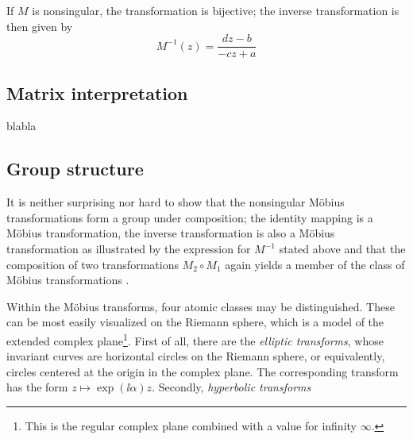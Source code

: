 If \(M\) is nonsingular, the transformation is bijective; the inverse transformation is then given by \cite{Needham1997}
\[ M^{-1}(z) = \frac{dz - b}{-cz + a} \]

    
\subsection{Matrix interpretation}
blabla

\subsection{Group structure}
It is neither surprising nor hard to show that the nonsingular Möbius transformations form a group under composition; the identity mapping is a Möbius transformation, the inverse transformation is also a Möbius transformation as illustrated by the expression for \(M^{-1}\) stated above and that the composition of two transformations \(M_2 \circ M_1\) again yields a member of the class of Möbius transformations \cite{Needham1997}.

Within the Möbius transforms, four atomic classes may be distinguished. These can be most easily visualized on the Riemann sphere, which is a model of the extended complex plane\footnote{This is the regular complex plane combined with a value for infinity \(\infty\).}. First of all, there are the \emph{elliptic transforms}, whose invariant curves are horizontal circles on the Riemann sphere, or equivalently, circles centered at the origin in the complex plane. The corresponding transform has the form \(z \mapsto \exp(\ii\alpha)z\). Secondly, \emph{hyperbolic transforms} 
